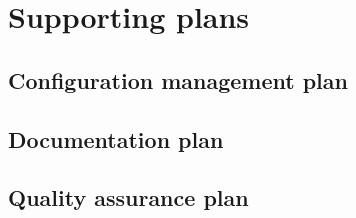 \documentclass[11pt, a4paper]{report}
\begin{document}
\pagebreak


\chapter{Supporting plans}

\section{Configuration management plan}

\section{Documentation plan}

\section{Quality assurance plan}

\pagebreak


\newpage
\appendix

\pagebreak

\chapter{}
\end{document}
